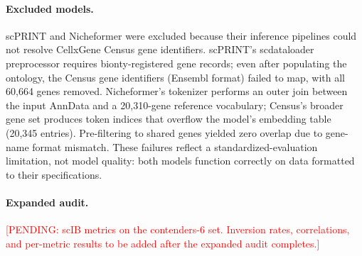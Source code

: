 \documentclass[11pt]{article}
\begin{document}
\paragraph{Excluded models.} scPRINT and Nicheformer were excluded because their inference pipelines could not resolve CellxGene Census gene identifiers. scPRINT's scdataloader preprocessor requires bionty-registered gene records; even after populating the ontology, the Census gene identifiers (Ensembl format) failed to map, with all 60{,}664 genes removed. Nicheformer's tokenizer performs an outer join between the input AnnData and a 20{,}310-gene reference vocabulary; Census's broader gene set produces token indices that overflow the model's embedding table (20{,}345 entries). Pre-filtering to shared genes yielded zero overlap due to gene-name format mismatch. These failures reflect a standardized-evaluation limitation, not model quality: both models function correctly on data formatted to their specifications.

\paragraph{Expanded audit.} \textcolor{red}{[PENDING: scIB metrics on the contenders-6 set. Inversion rates, correlations, and per-metric results to be added after the expanded audit completes.]}



\end{document}
